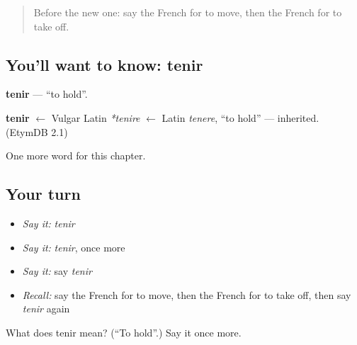 \begin{quote}
Before the new one: say the French for to move, then the French for to take off.
\end{quote}

\subsection*{You'll want to know: tenir}
\textbf{tenir} — \textquotedblleft{}to hold\textquotedblright{}.

\begin{cousinweb}
\textbf{tenir} $\leftarrow$ Vulgar Latin \emph{*tenire} $\leftarrow$ Latin \emph{tenere}, \textquotedblleft{}to hold\textquotedblright{} — inherited. (EtymDB 2.1)
\end{cousinweb}

\begin{grammarlens}[title={What you've built}]
One more word for this chapter.
\end{grammarlens}

\subsection*{Your turn}
\begin{itemize}
\raggedright
  \item \emph{Say it:} \emph{tenir}
  \item \emph{Say it:} \emph{tenir}, once more
  \item \emph{Say it:} say \emph{tenir}
  \item \emph{Recall:} say the French for to move, then the French for to take off, then say \emph{tenir} again
\end{itemize}

\begin{tcolorbox}[breakable,colback=teal!4,colframe=teal!35!black,title={Before you move on}]
What does tenir mean? (\textquotedblleft{}To hold\textquotedblright{}.) Say it once more.
\end{tcolorbox}
